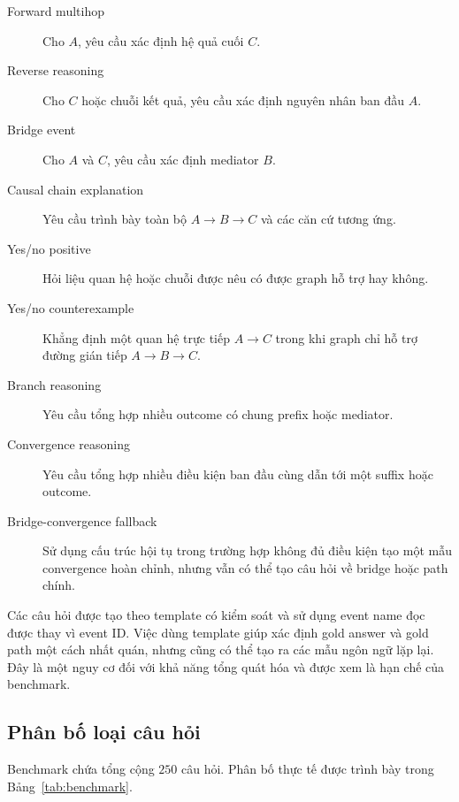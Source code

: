\begin{description}
    \item[Forward multihop] Cho \(A\), yêu cầu xác định hệ quả cuối \(C\).

    \item[Reverse reasoning] Cho \(C\) hoặc chuỗi kết quả, yêu cầu xác định
    nguyên nhân ban đầu \(A\).

    \item[Bridge event] Cho \(A\) và \(C\), yêu cầu xác định mediator \(B\).

    \item[Causal chain explanation] Yêu cầu trình bày toàn bộ
    \(A \rightarrow B \rightarrow C\) và các căn cứ tương ứng.

    \item[Yes/no positive] Hỏi liệu quan hệ hoặc chuỗi được nêu có được graph
    hỗ trợ hay không.

    \item[Yes/no counterexample] Khẳng định một quan hệ trực tiếp
    \(A \rightarrow C\) trong khi graph chỉ hỗ trợ đường gián tiếp
    \(A \rightarrow B \rightarrow C\).

    \item[Branch reasoning] Yêu cầu tổng hợp nhiều outcome có chung prefix
    hoặc mediator.

    \item[Convergence reasoning] Yêu cầu tổng hợp nhiều điều kiện ban đầu
    cùng dẫn tới một suffix hoặc outcome.

    \item[Bridge-convergence fallback] Sử dụng cấu trúc hội tụ trong trường
    hợp không đủ điều kiện tạo một mẫu convergence hoàn chỉnh, nhưng vẫn có
    thể tạo câu hỏi về bridge hoặc path chính.
\end{description}

Các câu hỏi được tạo theo template có kiểm soát và sử dụng event name đọc
được thay vì event ID. Việc dùng template giúp xác định gold answer và gold
path một cách nhất quán, nhưng cũng có thể tạo ra các mẫu ngôn ngữ lặp lại.
Đây là một nguy cơ đối với khả năng tổng quát hóa và được xem là hạn chế của
benchmark.

\subsection{Phân bố loại câu hỏi}

Benchmark chứa tổng cộng \(250\) câu hỏi. Phân bố thực tế được trình bày
trong Bảng~\ref{tab:benchmark}.

